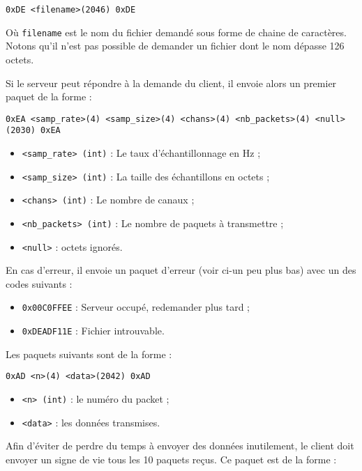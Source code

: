 \documentclass[a4paper,10pt,openany,oneside]{report}
\begin{document}
\begin{verbatim}
0xDE <filename>(2046) 0xDE
\end{verbatim}

Où \texttt{filename} est le nom du fichier demandé sous forme de chaine de
caractères. Notons qu'il n'est pas possible de demander un fichier dont le nom
dépasse 126 octets.

Si le serveur peut répondre à la demande du client, il envoie alors un premier
paquet de la forme :

\begin{verbatim}
0xEA <samp_rate>(4) <samp_size>(4) <chans>(4) <nb_packets>(4) <null>(2030) 0xEA
\end{verbatim}

\begin{itemize}
    \item \texttt{<samp\_rate> (int)} : Le taux d'échantillonnage en Hz ;
    \item \texttt{<samp\_size> (int)} : La taille des échantillons en octets ;
    \item \texttt{<chans> (int)} : Le nombre de canaux ;
    \item \texttt{<nb\_packets> (int)} : Le nombre de paquets à transmettre ;
    \item \texttt{<null>} : octets ignorés.
\end{itemize}

En cas d'erreur, il envoie un paquet d'erreur (voir ci-un peu plus bas) avec un
des codes suivants :

\begin{itemize}
    \item \texttt{0x00C0FFEE} : Serveur occupé, redemander plus tard ;
    \item \texttt{0xDEADF11E} : Fichier introuvable.
\end{itemize}

Les paquets suivants sont de la forme :

\begin{verbatim}
0xAD <n>(4) <data>(2042) 0xAD
\end{verbatim}

\begin{itemize}
    \item \texttt{<n> (int)} : le numéro du packet ;
    \item \texttt{<data>} : les données transmises.
\end{itemize}

Afin d'éviter de perdre du temps à envoyer des données inutilement, le client
doit envoyer un signe de vie tous les 10 paquets reçus. Ce paquet est de la
forme :
\end{document}
